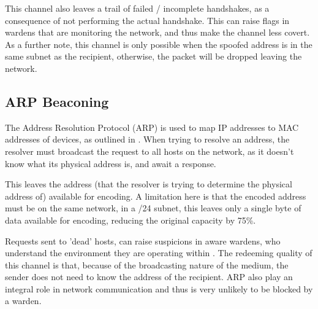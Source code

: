 This channel also leaves a trail of failed / incomplete handshakes, as a consequence of not performing the actual handshake. This can raise flags in wardens that are monitoring the network, and thus make the channel less covert. As a further note, this channel is only possible when the spoofed address is in the same subnet as the recipient, otherwise, the packet will be dropped leaving the network. 

\subsection{ARP Beaconing}
\label{sec:ARP}

The Address Resolution Protocol (ARP) is used to map IP addresses to MAC addresses of devices, as outlined in \cite{Arfc826}. When trying to resolve an address, the resolver must broadcast the request to all hosts on the network, as it doesn't know what its physical address is, and await a response.

This leaves the address (that the resolver is trying to determine the physical address of) available for encoding. A limitation here is that the encoded address must be on the same network, in a /24 subnet, this leaves only a single byte of data available for encoding, reducing the original capacity by 75\%.

Requests sent to 'dead' hosts, can raise suspicions in aware wardens, who understand the environment they are operating within \cite{CCUARP}. The redeeming quality of this channel is that, because of the broadcasting nature of the medium, the sender does not need to know the address of the recipient. ARP also play an integral role in network communication and thus is very unlikely to be blocked by a warden.
